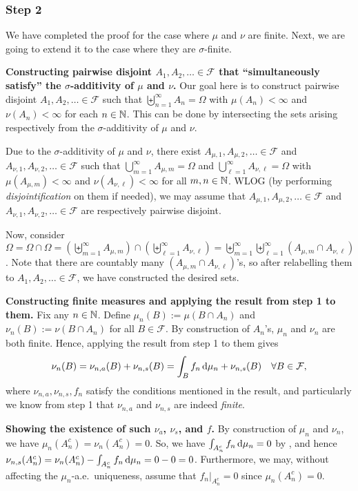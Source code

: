 \begin{enumerate}
\begin{pf}
\subsubsection*{Step 2}
We have completed the proof for the case where \(\mu\) and \(\nu\) are finite.
Next, we are going to extend it to the case where they are \(\sigma\)-finite.

\textbf{Constructing pairwise disjoint \(A_1,A_2,\dotsc\in\mathcal{F}\) that ``simultaneously
satisfy'' the \(\sigma\)-additivity of \(\mu\) and \(\nu\).}
Our goal here is to construct pairwise disjoint
\(A_1,A_2,\dotsc\in\mathcal{F}\) such that
\(\biguplus_{n=1}^{\infty}A_n=\Omega\) with \(\mu(A_n)<\infty\) and
\(\nu(A_n)<\infty\) for each \(n\in\mathbb{N}\). This can be done by intersecting the
sets arising respectively from the \(\sigma\)-additivity of \(\mu\) and \(\nu\).

Due to the \(\sigma\)-additivity of \(\mu\) and \(\nu\), there exist
\(A_{\mu,1},A_{\mu,2},\dotsc\in\mathcal{F}\) and \(A_{\nu,1},A_{\nu,2},\dotsc\in\mathcal{F}\)
such that \(\bigcup_{m=1}^{\infty}A_{\mu,m}=\Omega\) and
\(\bigcup_{\ell=1}^{\infty}A_{\nu,\ell}=\Omega\) with \(\mu(A_{\mu,m})<\infty\) and
\(\nu(A_{\nu,\ell})<\infty\) for all \(m,n\in\mathbb{N}\). WLOG (by performing
\emph{disjointification} on them if needed), we may assume that
\(A_{\mu,1},A_{\mu,2},\dotsc\in\mathcal{F}\) and \(A_{\nu,1},A_{\nu,2},\dotsc\in\mathcal{F}\)
are respectively pairwise disjoint.

Now, consider
\(\Omega=\Omega\cap\Omega=(\biguplus_{m=1}^{\infty}A_{\mu,m})\cap(\biguplus_{\ell=1}^{\infty}A_{\nu,\ell})=\biguplus_{m=1}^{\infty}\biguplus_{\ell=1}^{\infty}(A_{\mu,m}\cap
A_{\nu,\ell})\). Note that there are countably many \((A_{\mu,m}\cap
A_{\nu,\ell})\)'s, so after relabelling them to \(A_1,A_2,\dotsc\in\mathcal{F}\), we
have constructed the desired sets.

\textbf{Constructing finite measures and applying the result from step 1 to them.}
Fix any \(n\in\mathbb{N}\). Define \(\mu_n(B):=\mu(B\cap A_n)\) and
\(\nu_n(B):=\nu(B\cap A_n)\) for all \(B\in\mathcal{F}\). By construction of
\(A_n\)'s, \(\mu_n\) and \(\nu_n\) are both finite. Hence, applying the result
from step 1 to them gives
\[
\nu_n(B)=\nu_{n,a}(B)+\nu_{n,s}(B)=\int_{B}^{}f_n\odif{\mu_n}+\nu_{n,s}(B)
\quad\forall B\in\mathcal{F},
\]
where \(\nu_{n,a},\nu_{n,s},f_n\) satisfy the conditions mentioned in the result,
and particularly we know from step 1 that \(\nu_{n,a}\) and \(\nu_{n,s}\) are
indeed \emph{finite}.

\textbf{Showing the existence of such \(\nu_a\), \(\nu_s\), and \(f\).} By
construction of \(\mu_n\) and \(\nu_n\), we have
\(\mu_n(A_n^c)=\nu_n(A_n^c)=0\). So, we have
\(\int_{A_n^c}^{}f_n\odif{\mu_n}=0\) by , and hence
\(\nu_{n,s}(A_n^c)=\nu_n(A_n^c)-\int_{A_n^c}^{}f_n\odif{\mu_n}=0-0=0\).
Furthermore, we may, without affecting the \(\mu_n\)-a.e.\ uniqueness, assume
that \(f_n|_{A_n^c}=0\) since \(\mu_n(A_n^c)=0\).


\end{pf}
\end{enumerate}
